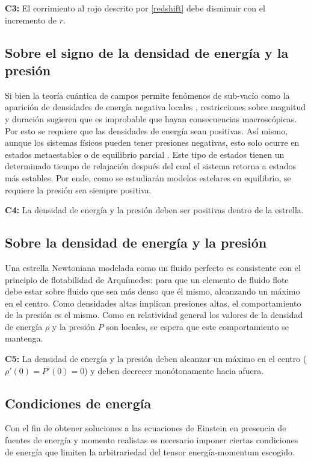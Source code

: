 \textbf{C3:} El corrimiento al rojo descrito por \eqref{redshift} debe disminuir con el incremento de $r$.
\subsection*{Sobre el signo de la densidad de energía y la presión}
\noindent Si bien la teoría cuántica de campos permite fenómenos de sub-vacío como la aparición de densidades de energía negativa locales \cite{Ford2010}, restricciones sobre magnitud y duración sugieren que es improbable que hayan consecuencias macroscópicas. Por esto se requiere que las densidades de energía sean positivas.
Así mismo, aunque los sistemas físicos pueden tener presiones negativas, esto solo ocurre en estados metaestables o de equilibrio parcial \cite{Landau1980}. Este tipo de estados tienen un determinado tiempo de relajación después del cual el sistema retorna a estados más estables. Por ende, como se estudiarán modelos estelares en equilibrio, se requiere la presión sea siempre positiva. 

\textbf{C4:} La densidad de energía y la presión deben ser positivas dentro de la estrella. 

\subsection*{Sobre la densidad de energía y la presión}

\noindent Una estrella Newtoniana modelada como un fluido perfecto es consistente con el principio de flotabilidad de Arquímedes: para que un elemento de fluido flote debe estar sobre fluido que sea más denso que él mismo, alcanzando un máximo en el centro. Como densidades altas implican presiones altas, el comportamiento de la presión es el mismo. Como en relatividad general los valores de la densidad de energía $\rho$ y la presión $P$ son locales, se espera que este comportamiento se mantenga.

\textbf{C5:} La densidad de energía y la presión deben alcanzar un máximo en el centro ($\rho'(0)=P'(0)=0$) y deben decrecer monótonamente hacia afuera.

\subsection*{Condiciones de energía}
\noindent Con el fin de obtener soluciones a las ecuaciones de Einstein en presencia de fuentes de energía y momento realistas es necesario imponer ciertas condiciones de energía que limiten la arbitrariedad del tensor energía-momentum escogido.

